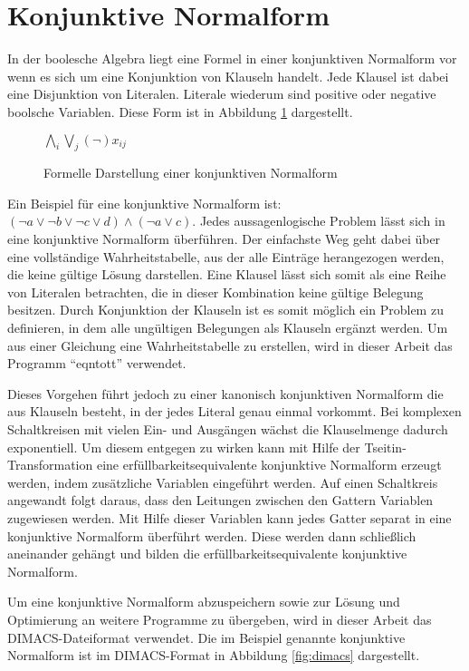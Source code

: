 \section{Konjunktive Normalform}
\label{sec:knf}

In der boolesche Algebra liegt eine Formel in einer konjunktiven Normalform vor wenn es sich um eine Konjunktion von Klauseln handelt.
Jede Klausel ist dabei eine Disjunktion von Literalen. Literale wiederum sind positive oder negative boolsche Variablen. Diese Form
ist in Abbildung \ref{fig:knf} dargestellt.

\begin{figure}[!h]
  \centering
  $ \bigwedge\limits_{i} \bigvee\limits_{j} (\neg)x_{ij} $
  \caption{Formelle Darstellung einer konjunktiven Normalform}
  \label{fig:knf}
\end{figure}

Ein Beispiel für eine konjunktive Normalform ist: $ (\neg a \vee \neg b \vee \neg c \vee d) \wedge (\neg a \vee c) $.
Jedes aussagenlogische Problem lässt sich in eine konjunktive Normalform überführen. Der einfachste Weg geht dabei über
eine vollständige Wahrheitstabelle, aus der alle Einträge herangezogen werden, die keine gültige Lösung darstellen. Eine
Klausel lässt sich somit als eine Reihe von Literalen betrachten, die in dieser Kombination keine gültige Belegung besitzen.
Durch Konjunktion der Klauseln ist es somit möglich ein Problem zu definieren, in dem alle ungültigen Belegungen als
Klauseln ergänzt werden. Um aus einer Gleichung eine Wahrheitstabelle zu erstellen, wird in dieser Arbeit das Programm
"`eqntott"' verwendet.

Dieses Vorgehen führt jedoch zu einer kanonisch konjunktiven Normalform die aus Klauseln besteht, in der jedes Literal
genau einmal vorkommt. Bei komplexen Schaltkreisen mit vielen Ein- und Ausgängen wächst die Klauselmenge dadurch exponentiell.
Um diesem entgegen zu wirken kann mit Hilfe der Tseitin-Transformation \cite{wiki:tseitin} eine erfüllbarkeitsequivalente
konjunktive Normalform erzeugt werden, indem zusätzliche Variablen eingeführt werden. Auf einen Schaltkreis angewandt folgt daraus,
dass den Leitungen zwischen den Gattern Variablen zugewiesen werden. Mit Hilfe dieser Variablen kann jedes Gatter separat in eine
konjunktive Normalform überführt werden. Diese werden dann schließlich aneinander gehängt und bilden die erfüllbarkeitsequivalente
konjunktive Normalform.

Um eine konjunktive Normalform abzuspeichern sowie zur Lösung und Optimierung an weitere Programme zu übergeben, wird in dieser
Arbeit das DIMACS-Dateiformat verwendet. Die im Beispiel genannte konjunktive Normalform ist im DIMACS-Format in Abbildung
\ref{fig:dimacs} dargestellt.

